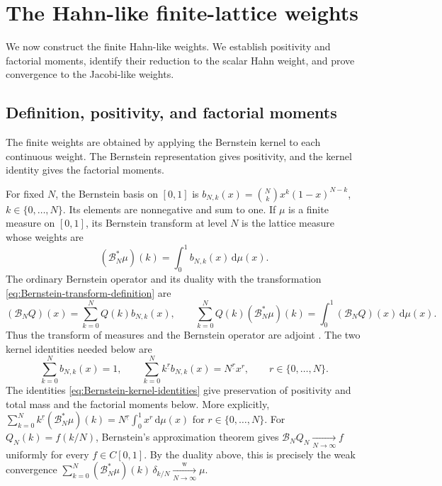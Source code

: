 \documentclass[10pt]{amsart}
\newcommand{\dd}{\,\mathrm d}
\newcommand{\fall}[2]{#1^{\underline{#2}}}
\theoremstyle{plain}
\theoremstyle{definition}
\theoremstyle{remark}
\begin{document}
\section{The Hahn-like finite-lattice weights}
\label{sec:Hahn-weights}

We now construct the finite Hahn-like weights. We establish positivity and
factorial moments, identify their reduction to the scalar Hahn weight, and
prove convergence
to the Jacobi-like weights.

\subsection{Definition, positivity, and factorial moments}

The finite weights are obtained by applying the Bernstein kernel to each
continuous weight. The Bernstein representation gives positivity, and the
kernel identity gives the factorial moments.

For fixed \(N\), the Bernstein basis on \([0,1]\) is
\(b_{N,k}(x)=\binom Nkx^k(1-x)^{N-k}\),
\(k\in\{0,\ldots,N\}\).
Its elements are nonnegative and sum to one. If \(\mu\) is a finite measure
on \([0,1]\), its Bernstein transform at level \(N\) is the lattice measure
whose weights are
\begin{equation}
 (\mathscr B_N^*\mu)(k)=\int_0^1b_{N,k}(x)\dd\mu(x).
 \label{eq:Bernstein-transform-definition}
\end{equation}
The ordinary Bernstein operator and its duality with the transformation
\eqref{eq:Bernstein-transform-definition} are
\begin{equation}
 (\mathscr B_NQ)(x)=\sum_{k=0}^NQ(k)b_{N,k}(x),\qquad
 \sum_{k=0}^NQ(k)(\mathscr B_N^*\mu)(k)
 =\int_0^1(\mathscr B_NQ)(x)\dd\mu(x).
 \label{eq:Bernstein-operator}
\end{equation}
Thus the transform of measures and the Bernstein operator are adjoint
\cite{Lorentz1986}.  The two kernel identities needed below are
\begin{equation}
 \sum_{k=0}^Nb_{N,k}(x)=1,
 \qquad
 \sum_{k=0}^N\fall{k}{r}b_{N,k}(x)=\fall{N}{r}x^r,
 \qquad r\in\{0,\ldots,N\}.
 \label{eq:Bernstein-kernel-identities}
\end{equation}
The identities \eqref{eq:Bernstein-kernel-identities} give preservation of
positivity and total mass and the factorial moments below. More explicitly,
\(\sum_{k=0}^N\fall{k}{r}(\mathscr B_N^*\mu)(k)
=\fall{N}{r}\int_0^1x^r\dd\mu(x)\) for
\(r\in\{0,\ldots,N\}\).
For \(Q_N(k)=f(k/N)\), Bernstein's approximation theorem gives
\(\mathscr B_NQ_N\xrightarrow[N\to\infty]{} f\) uniformly for every
\(f\in C[0,1]\).  By the
duality above, this is precisely the weak convergence
\(
 \sum_{k=0}^N(\mathscr B_N^*\mu)(k)\,\delta_{k/N}
 \xrightarrow[N\to\infty]{\mathrm w} \mu
\).
\end{document}
